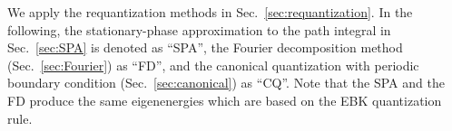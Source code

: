 \documentclass[%
superscriptaddress,
preprint,
showpacs,
nofootinbib,
amsmath,amssymb,
aps,
prc,
floatfix ]%
{revtex4-1}
\begin{document}



We apply the requantization methods in Sec.~\ref{sec:requantization}.
In the following, the stationary-phase approximation to the path
integral in Sec.~\ref{sec:SPA} is denoted as ``SPA'',
the Fourier decomposition method (Sec.~\ref{sec:Fourier}) as ``FD'',
and the canonical quantization with periodic boundary condition 
(Sec.~\ref{sec:canonical}) as ``CQ''.
Note that the SPA and the FD produce the same eigenenergies which
are based on the EBK quantization rule.
\end{document}
